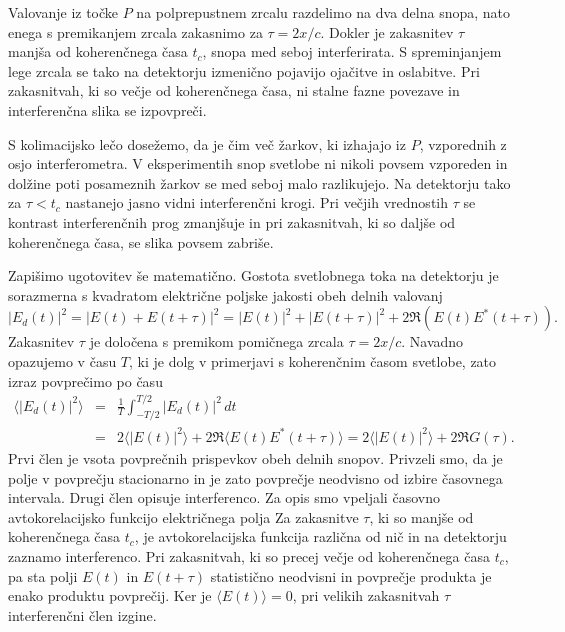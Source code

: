 Valovanje iz točke $P$ na polprepustnem zrcalu razdelimo na dva delna snopa, 
nato enega s premikanjem zrcala zakasnimo za $\tau=2x/c$. Dokler je zakasnitev
$\tau$ manjša od koherenčnega časa $t_{c}$, snopa med seboj interferirata.
S spreminjanjem lege zrcala se tako na detektorju izmenično pojavijo ojačitve in 
oslabitve. Pri zakasnitvah, ki so večje od koherenčnega časa, ni stalne fazne 
povezave in interferenčna slika se izpovpreči. 

\begin{remark}
S kolimacijsko lečo dosežemo, da je čim več žarkov, ki izhajajo iz
$P$, vzporednih z osjo interferometra. V eksperimentih snop svetlobe 
ni nikoli povsem vzporeden in dolžine poti posameznih žarkov se med
seboj malo razlikujejo. Na detektorju tako za $\tau < t_c$ nastanejo jasno 
vidni interferenčni krogi. Pri večjih vrednostih $\tau$  se kontrast interferenčnih
prog zmanjšuje in pri zakasnitvah, ki so daljše od koherenčnega časa, se 
slika povsem zabriše. 
\end{remark}

Zapišimo ugotovitev še matematično.
Gostota svetlobnega toka na detektorju je sorazmerna s kvadratom električne
poljske jakosti obeh delnih valovanj
\begin{equation}
|E_{d}(t)|^{2}=|E(t)+E(t+\tau)|^{2}=|E(t)|^{2}+|E(t+\tau)|^{2}+2\Re \left(E(t)E^{*}(t+\tau)\right).
\label{eq:Michelson-intenziteta}
\end{equation}
Zakasnitev $\tau$ je določena s premikom pomičnega zrcala $\tau=2x/c$.
Navadno opazujemo v času $T$, ki je dolg v primerjavi s koherenčnim
časom svetlobe, zato izraz povprečimo po času
\begin{eqnarray}
\langle|E_{d}(t)|^{2}\rangle & = & \frac{1}{T}\int_{-T/2}^{T/2}|E{}_{d}(t)|^{2}\, dt\nonumber \\
 & = & 2\langle|E(t)|^{2}\rangle+2\Re\langle E(t)E^{*}(t+\tau)\rangle = 2\langle|E(t)|^{2}\rangle+2\Re G(\tau).
 \label{eq:caskohav}
\end{eqnarray}
Prvi člen je vsota povprečnih prispevkov obeh delnih snopov. Privzeli
smo, da je polje v povprečju stacionarno in je zato povprečje neodvisno
od izbire časovnega intervala. Drugi člen opisuje interferenco. 
Za opis smo vpeljali
časovno avtokorelacijsko funkcijo
električnega polja 
Za zakasnitve $\tau$, ki so manjše od koherenčnega časa $t_c$, je avtokorelacijska
funkcija različna od nič in na
detektorju zaznamo interferenco. Pri zakasnitvah, ki so precej
večje od koherenčnega časa $t_{c}$, pa sta polji $E(t)$ in $E(t+\tau)$
statistično neodvisni in povprečje produkta je enako produktu povprečij.
Ker je $\langle E(t)\rangle=0$, pri velikih zakasnitvah $\tau$ interferenčni
člen izgine.

